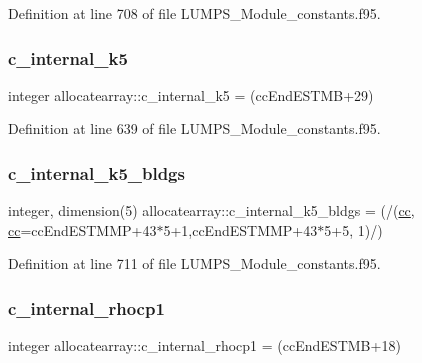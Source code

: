 Definition at line 708 of file L\+U\+M\+P\+S\+\_\+\+Module\+\_\+constants.\+f95.

\mbox{\label{namespaceallocatearray_ae5939d57a10a1bdad70a9a8db727ce15}} 
\subsubsection{\texorpdfstring{c\+\_\+internal\+\_\+k5}{c\_internal\_k5}}
{\footnotesize\ttfamily integer allocatearray\+::c\+\_\+internal\+\_\+k5 = (cc\+End\+E\+S\+T\+MB+29)}



Definition at line 639 of file L\+U\+M\+P\+S\+\_\+\+Module\+\_\+constants.\+f95.

\mbox{\label{namespaceallocatearray_a929dafc0dac03e78c84c0a23d926aea8}} 
\subsubsection{\texorpdfstring{c\+\_\+internal\+\_\+k5\+\_\+bldgs}{c\_internal\_k5\_bldgs}}
{\footnotesize\ttfamily integer, dimension(5) allocatearray\+::c\+\_\+internal\+\_\+k5\+\_\+bldgs = (/(\hyperlink{namespaceallocatearray_ac863c81704eb507dee10f5e10741e10c}{cc}, \hyperlink{namespaceallocatearray_ac863c81704eb507dee10f5e10741e10c}{cc}=cc\+End\+E\+S\+T\+M\+MP+43$\ast$5+1,cc\+End\+E\+S\+T\+M\+MP+43$\ast$5+5, 1)/)}



Definition at line 711 of file L\+U\+M\+P\+S\+\_\+\+Module\+\_\+constants.\+f95.

\mbox{\label{namespaceallocatearray_ab53123d58659c938997ac4cafa354b59}} 
\subsubsection{\texorpdfstring{c\+\_\+internal\+\_\+rhocp1}{c\_internal\_rhocp1}}
{\footnotesize\ttfamily integer allocatearray\+::c\+\_\+internal\+\_\+rhocp1 = (cc\+End\+E\+S\+T\+MB+18)}



